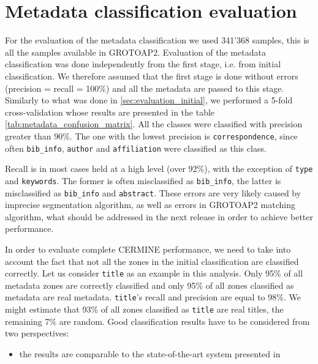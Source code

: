\section{Metadata classification evaluation}
For the evaluation of the metadata classification we used 341'368 samples, this is all the samples available in GROTOAP2. Evaluation of the metadata classification was done independently from the first stage, i.e. from initial classification. We therefore assumed that the first stage is done without errors (precision = recall = 100\%) and all the metadata are passed to this stage. Similarly to what was done in \ref{sec:evaluation_initial}, we performed a 5-fold cross-validation whose results are presented in the table \ref{tab:metadata_confusion_matrix}. All the classes were classified with precision greater than 90\%. The one with the lowest precision is \verb+correspondence+, since often \verb+bib_info+, \verb+author+ and \verb+affiliation+ were classified as this class.

Recall is in most cases held at a high level (over 92\%), with the exception of \verb+type+ and \verb+keywords+. The former is often misclassified as \verb+bib_info+, the latter is misclassified as \verb+bib_info+ and \verb+abstract+. These errors are very likely caused by imprecise segmentation algorithm, as well as errors in GROTOAP2 matching algorithm, what should be addressed in the next release in order to achieve better performance.

In order to evaluate complete CERMINE performance, we need to take into account the fact that not all the zones in the initial classification are classified correctly. Let us consider \verb+title+ as an example in this analysis. Only 95\% of all metadata zones are correctly classified and only 95\% of all zones classified as metadata are real metadata. \verb+title+'s recall and precision are equal to 98\%. We might estimate that 93\% of all zones classified as \verb+title+ are real titles, the remaining 7\% are random.
\vspace{2cm}
Good classification results have to be considered from two perspectives:
\begin{itemize}
\item the results are comparable to the state-of-the-art system presented in \cite{Kern2012}
\end{itemize}



